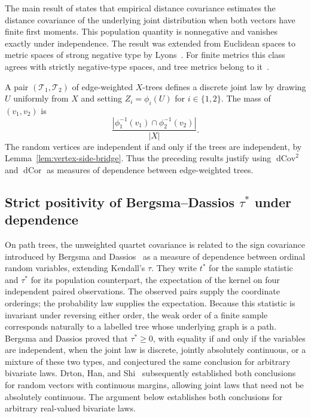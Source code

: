 \documentclass[12pt]{article}
\DeclareMathOperator{\dCov}{dCov}
\DeclareMathOperator{\dCor}{dCor}
\begin{document}
The main result of \cite{SzekelyRizzoBakirov2007} states that empirical
distance covariance estimates the distance covariance of the underlying
joint distribution when both vectors have finite first moments.  This
population quantity is nonnegative and vanishes exactly under
independence.  The result was extended from Euclidean spaces to metric
spaces of strong negative type by Lyons~\cite{Lyons2013}.  For finite
metrics this class agrees with strictly negative-type spaces, and tree
metrics belong to it~\cite{HjorthEtAl1998}.

A pair $(\mathcal T_1,\mathcal T_2)$ of edge-weighted $X$-trees defines
a discrete joint law by drawing $U$ uniformly from $X$ and setting
$Z_i=\phi_i(U)$ for $i\in\{1,2\}$.  The mass of
$(v_1,v_2)$ is
\begin{equation}\label{eq:display-085}
\frac{|\phi_1^{-1}(v_1)\cap\phi_2^{-1}(v_2)|}{|X|}.
\end{equation}
The random vertices are independent if and only if the trees are independent,
by Lemma~\ref{lem:vertex-side-bridge}.  Thus the preceding results justify
using $\dCov^2$ and $\dCor$ as measures of dependence between edge-weighted
trees.

\subsection{Strict positivity of Bergsma--Dassios
\texorpdfstring{$\tau^*$}{tau-star} under dependence}
\label{subsec:tau-star}

On path trees, the unweighted quartet covariance is related to the
sign covariance introduced by Bergsma and
Dassios~\cite{BergsmaDassios2014} as a measure of dependence between ordinal
random variables, extending Kendall's $\tau$.  They write $t^*$ for the sample
statistic and $\tau^*$ for its population counterpart, the expectation of the
kernel on four independent paired observations.  The observed pairs supply
the coordinate orderings; the probability law supplies the expectation.
Because this statistic is invariant under reversing either order, the weak order
of a finite sample corresponds naturally to a labelled tree whose underlying
graph is a path.  Bergsma and Dassios proved that $\tau^*\ge0$, with
equality if and only if the variables are independent, when the joint law
is discrete, jointly absolutely continuous, or a mixture of these two
types, and conjectured the same conclusion for arbitrary bivariate laws.
Drton, Han, and Shi~\cite[Theorem~6.1]{DrtonHanShi2020} subsequently
established both conclusions for random vectors with continuous margins,
allowing joint laws that need not be absolutely continuous.  The argument
below establishes both conclusions for arbitrary real-valued bivariate laws.
\end{document}
